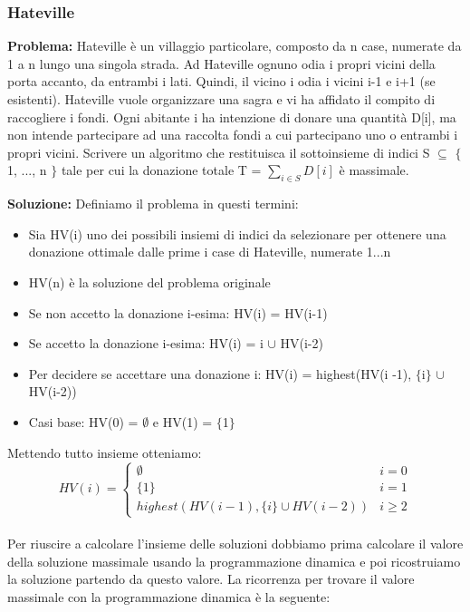 \documentclass[../cheatSheetAlgoritmi.tex]{subfiles}
\begin{document}
\subsubsection{Hateville}
\textbf{Problema:} Hateville è un villaggio particolare, composto da n case, numerate da 1 a n lungo una singola strada. Ad Hateville ognuno odia i propri vicini della porta accanto, da entrambi i lati. Quindi, il vicino i odia i vicini i-1 e i+1 (se esistenti).
Hateville vuole organizzare una sagra e vi ha affidato il compito di
raccogliere i fondi. Ogni abitante i ha intenzione di donare una quantità D[i], ma non intende partecipare ad una raccolta fondi a cui partecipano uno o entrambi i propri vicini. Scrivere un algoritmo che restituisca il sottoinsieme di indici S  $\subseteq$ $\{$1, ..., n $\}$ tale per cui la donazione totale T = $\sum\limits_{i \in S} {D[i]}$ è massimale. 
\newpage
\begin{flushleft}
\textbf{Soluzione:} Definiamo il problema in questi termini: 
\end{flushleft}
\begin{itemize}
	\item Sia HV(i) uno dei possibili insiemi di indici da selezionare per ottenere una donazione ottimale dalle prime i case di Hateville,
numerate 1...n
	\item HV(n) è la soluzione del problema originale
	\item Se non accetto la donazione i-esima: HV(i) = HV(i-1)
	\item Se accetto la donazione i-esima: HV(i) = {i} $\cup$ HV(i-2)
	\item Per decidere se accettare una donazione i: HV(i) = highest(HV(i -1),  $\{$i$\}$ $\cup$ HV(i-2))
	\item Casi base: HV(0) = $\emptyset$ e HV(1) = $\{$1$\}$ \\
\end{itemize} 
Mettendo tutto insieme otteniamo:
\begin{equation*}
  	HV(i) =\begin{cases}
    	\emptyset & \text{$i = 0$}\\
    	\{1\} & \text{$i = 1$}\\
    	highest(HV(i -1), \{i\} \cup HV(i-2)) & \text{$i \ge 2$}
  	\end{cases}
\end{equation*} \\
Per riuscire a calcolare l'insieme delle soluzioni dobbiamo prima calcolare il valore della soluzione massimale usando la programmazione dinamica e poi ricostruiamo la soluzione partendo da questo valore. La ricorrenza per trovare il valore massimale con la programmazione dinamica è la seguente:
\end{document}
